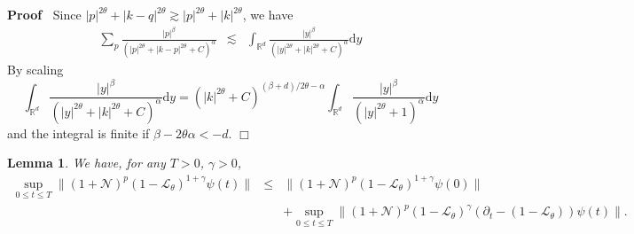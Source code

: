 \documentclass{article}
\newcommand{\mathd}{\mathrm{d}}
\newenvironment{proof}{\noindent\textbf{Proof\ }}{\hspace*{\fill}$\Box$\medskip}
\newtheorem{lemma}{Lemma}
\begin{document}
\begin{proof}
  Since $| p |^{2 \theta} + | k - q |^{2 \theta} \gtrsim | p |^{2 \theta} + |
  k |^{2 \theta}$, we have
  \[ \begin{array}{lll}
       \sum_p \frac{| p |^{\beta}}{(| p |^{2 \theta} + | k - p |^{2 \theta} +
       C)^{\alpha}} & \lesssim & \int_{\mathbb{R}^d} \frac{| y |^{\beta}}{(| y
       |^{2 \theta} + | k |^{2 \theta} + C)^{\alpha}} \mathd y
     \end{array} \]
  By scaling
  \[ \int_{\mathbb{R}^d} \frac{| y |^{\beta}}{(| y |^{2 \theta} + | k |^{2
     \theta} + C)^{\alpha}} \mathd y = (| k |^{2 \theta} + C)^{(\beta + d) / 2
     \theta - \alpha} \int_{\mathbb{R}^d} \frac{| y |^{\beta}}{(| y |^{2
     \theta} + 1)^{\alpha}} \mathd y \]
  and the integral is finite if $\beta - 2 \theta \alpha < - d$.
\end{proof}

\begin{lemma}
  \label{lemma:schauder}We have, for any $T > 0$, $\gamma > 0$,
  \begin{eqnarray*}
    \sup_{0 \leqslant t \leqslant T} \| (1 +\mathcal{N})^p (1
    -\mathcal{L}_{\theta})^{1 + \gamma} \psi (t) \| & \leqslant & \| (1
    +\mathcal{N})^p (1 -\mathcal{L}_{\theta})^{1 + \gamma} \psi (0) \|\\
    &  & + \sup_{0 \leqslant t \leqslant T} \| (1 +\mathcal{N})^p (1
    -\mathcal{L}_{\theta})^{\gamma} (\partial_t - (1 -\mathcal{L}_{\theta}))
    \psi (t) \| .
  \end{eqnarray*}
\end{lemma}
\end{document}
